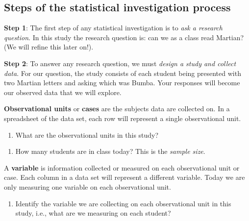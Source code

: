 \documentclass[
]{report}
\providecommand{\tightlist}{%
  \setlength{\itemsep}{0pt}\setlength{\parskip}{0pt}}
\begin{document}
\vspace{0.3in}

\hypertarget{steps-of-the-statistical-investigation-process}{%
\subsection{Steps of the statistical investigation process}\label{steps-of-the-statistical-investigation-process}}

\textbf{Step 1}: The first step of any statistical investigation is to \emph{ask a research question}. In this study the research question is: can we as a class read Martian? (We will refine this later on!).

\textbf{Step 2}: To answer any research question, we must \emph{design a study and collect data}. For our question, the study consists of each student being presented with two Martian letters and asking which was Bumba. Your responses will become our observed data that we will explore.

\newpage

\textbf{Observational units} or \textbf{cases} are the subjects data are collected on. In a spreadsheet of the data set, each row will represent a single observational unit.

\begin{enumerate}
\def\labelenumi{\arabic{enumi}.}
\tightlist
\item
  What are the observational units in this study?
\end{enumerate}

\vspace{0.4in}

\begin{enumerate}
\def\labelenumi{\arabic{enumi}.}
\setcounter{enumi}{1}
\tightlist
\item
  How many students are in class today? This is the \emph{sample size}.
\end{enumerate}

\vspace{0.3in}

A \textbf{variable} is information collected or measured on each observational unit or case. Each column in a data set will represent a different variable. Today we are only measuring one variable on each observational unit.

\begin{enumerate}
\def\labelenumi{\arabic{enumi}.}
\setcounter{enumi}{2}
\tightlist
\item
  Identify the variable we are collecting on each observational unit in this study, i.e., what are we measuring on each student?
\end{enumerate}
\end{document}
